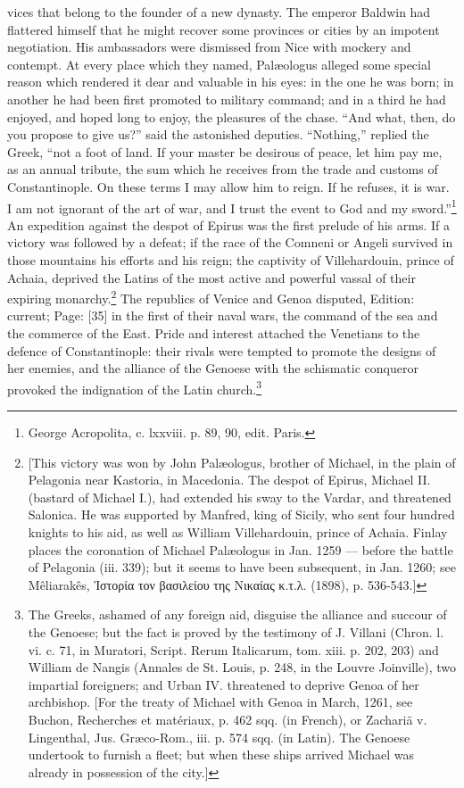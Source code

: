 vices that belong to the founder of a new dynasty. The emperor Baldwin had flattered himself that he might recover some provinces or cities by an impotent negotiation. His ambassadors were dismissed from Nice with mockery and contempt. At every place which they named, Palæologus alleged some special reason which rendered it dear and valuable in his eyes: in the one he was born; in another he had been first promoted to military command; and in a third he had enjoyed, and hoped long to enjoy, the pleasures of the chase. \texthebrew{“}And what, then, do you propose to give us?\texthebrew{}” said the astonished deputies. \texthebrew{“}Nothing,\texthebrew{}” replied the Greek, \texthebrew{“}not a foot of land. If your master be desirous of peace, let him pay me, as an annual tribute, the sum which he receives from the trade and customs of Constantinople. On these terms I may allow him to reign. If he refuses, it is war. I am not ignorant of the art of war, and I trust the event to God and my sword.\texthebrew{}”\footnote{George Acropolita, c. lxxviii. p. 89, 90, edit. Paris.} An expedition against the despot of Epirus was the first prelude of his arms. If a victory was followed by a defeat; if the race of the Comneni or Angeli survived in those mountains his efforts and his reign; the captivity of Villehardouin, prince of Achaia, deprived the Latins of the most active and powerful vassal of their expiring monarchy.\footnote{[This victory was won by John Palæologus, brother of Michael, in the plain of Pelagonia near Kastoria, in Macedonia. The despot of Epirus, Michael II. (bastard of Michael I.), had extended his sway to the Vardar, and threatened Salonica. He was supported by Manfred, king of Sicily, who sent four hundred knights to his aid, as well as William Villehardouin, prince of Achaia. Finlay places the coronation of Michael Palæologus in Jan. 1259 \texthebrew{—} before the battle of Pelagonia (iii. 339); but it seems to have been subsequent, in Jan. 1260; see Mêliarakês, \textgreek{\texthebrew{Ἱ}στορία τον βασιλείου της Νικαίας κ.τ.λ}. (1898), p. 536-543.]} The republics of Venice and Genoa disputed, Edition: current; Page: [35] in the first of their naval wars, the command of the sea and the commerce of the East. Pride and interest attached the Venetians to the defence of Constantinople: their rivals were tempted to promote the designs of her enemies, and the alliance of the Genoese with the schismatic conqueror provoked the indignation of the Latin church.\footnote{The Greeks, ashamed of any foreign aid, disguise the alliance and succour of the Genoese; but the fact is proved by the testimony of J. Villani (Chron. l. vi. c. 71, in Muratori, Script. Rerum Italicarum, tom. xiii. p. 202, 203) and William de Nangis (Annales de St. Louis, p. 248, in the Louvre Joinville), two impartial foreigners; and Urban IV. threatened to deprive Genoa of her archbishop. [For the treaty of Michael with Genoa in March, 1261, see Buchon, Recherches et matériaux, p. 462 sqq. (in French), or Zachariä v. Lingenthal, Jus. Græco-Rom., iii. p. 574 sqq. (in Latin). The Genoese undertook to furnish a fleet; but when these ships arrived Michael was already in possession of the city.]}

